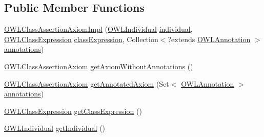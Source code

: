 \subsection*{Public Member Functions}
\begin{DoxyCompactItemize}
\item 
\hyperlink{classuk_1_1ac_1_1manchester_1_1cs_1_1owl_1_1owlapi_1_1_o_w_l_class_assertion_axiom_impl_aa2bff52297afde2a58c0b3c3a81ea4bf}{O\-W\-L\-Class\-Assertion\-Axiom\-Impl} (\hyperlink{interfaceorg_1_1semanticweb_1_1owlapi_1_1model_1_1_o_w_l_individual}{O\-W\-L\-Individual} \hyperlink{classuk_1_1ac_1_1manchester_1_1cs_1_1owl_1_1owlapi_1_1_o_w_l_class_assertion_axiom_impl_a9964ce9818b14016a0e1943ca74dd249}{individual}, \hyperlink{interfaceorg_1_1semanticweb_1_1owlapi_1_1model_1_1_o_w_l_class_expression}{O\-W\-L\-Class\-Expression} \hyperlink{classuk_1_1ac_1_1manchester_1_1cs_1_1owl_1_1owlapi_1_1_o_w_l_class_assertion_axiom_impl_a6a80c806c749e634253e10f0acc080ea}{class\-Expression}, Collection$<$?extends \hyperlink{interfaceorg_1_1semanticweb_1_1owlapi_1_1model_1_1_o_w_l_annotation}{O\-W\-L\-Annotation} $>$ \hyperlink{classuk_1_1ac_1_1manchester_1_1cs_1_1owl_1_1owlapi_1_1_o_w_l_axiom_impl_af6fbf6188f7bdcdc6bef5766feed695e}{annotations})
\item 
\hyperlink{interfaceorg_1_1semanticweb_1_1owlapi_1_1model_1_1_o_w_l_class_assertion_axiom}{O\-W\-L\-Class\-Assertion\-Axiom} \hyperlink{classuk_1_1ac_1_1manchester_1_1cs_1_1owl_1_1owlapi_1_1_o_w_l_class_assertion_axiom_impl_a747f4159615a24b4162b9544b0164a10}{get\-Axiom\-Without\-Annotations} ()
\item 
\hyperlink{interfaceorg_1_1semanticweb_1_1owlapi_1_1model_1_1_o_w_l_class_assertion_axiom}{O\-W\-L\-Class\-Assertion\-Axiom} \hyperlink{classuk_1_1ac_1_1manchester_1_1cs_1_1owl_1_1owlapi_1_1_o_w_l_class_assertion_axiom_impl_a9c982150b48bcf94e8642437ef4b1b68}{get\-Annotated\-Axiom} (Set$<$ \hyperlink{interfaceorg_1_1semanticweb_1_1owlapi_1_1model_1_1_o_w_l_annotation}{O\-W\-L\-Annotation} $>$ \hyperlink{classuk_1_1ac_1_1manchester_1_1cs_1_1owl_1_1owlapi_1_1_o_w_l_axiom_impl_af6fbf6188f7bdcdc6bef5766feed695e}{annotations})
\item 
\hyperlink{interfaceorg_1_1semanticweb_1_1owlapi_1_1model_1_1_o_w_l_class_expression}{O\-W\-L\-Class\-Expression} \hyperlink{classuk_1_1ac_1_1manchester_1_1cs_1_1owl_1_1owlapi_1_1_o_w_l_class_assertion_axiom_impl_a89161dd73ee39f22fc25a6366bed2442}{get\-Class\-Expression} ()
\item 
\hyperlink{interfaceorg_1_1semanticweb_1_1owlapi_1_1model_1_1_o_w_l_individual}{O\-W\-L\-Individual} \hyperlink{classuk_1_1ac_1_1manchester_1_1cs_1_1owl_1_1owlapi_1_1_o_w_l_class_assertion_axiom_impl_ac9334a4c71033833d0449341951450f7}{get\-Individual} ()

\end{DoxyCompactItemize}
